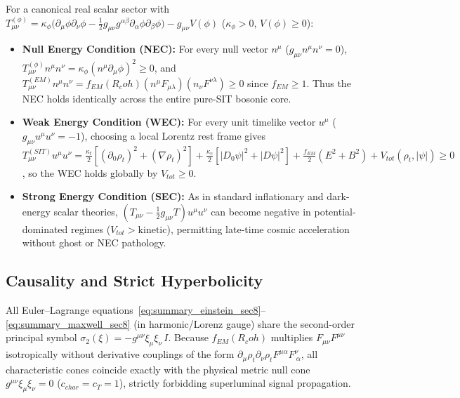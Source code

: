 \documentclass[american,11pt,letterpaper]{article}
\newcommand{\Rcoh}{R_{\mathrm{coh}}}
\def\mathbf#1{#1}%
\def\mathrm#1{#1}%
\def\Rcoh{R_coh}%
\begin{document}
For a canonical real scalar sector with $T_{\mu\nu}^{(\phi)} = \kappa_\phi\bigl(\partial_\mu\phi\partial_\nu\phi - \frac{1}{2}g_{\mu\nu}g^{\alpha\beta}\partial_\alpha\phi\partial_\beta\phi\bigr) - g_{\mu\nu}V(\phi)$ ($\kappa_\phi > 0$, $V(\phi) \ge 0$):
\begin{itemize}
  \item \textbf{Null Energy Condition (NEC):} For every null vector $n^\mu$ ($g_{\mu\nu}n^\mu n^\nu = 0$), $T_{\mu\nu}^{(\phi)}n^\mu n^\nu = \kappa_\phi(n^\mu\partial_\mu\phi)^2 \ge 0$, and $T_{\mu\nu}^{(\mathrm{EM})}n^\mu n^\nu = f_{\mathrm{EM}}(\Rcoh)(n^\mu F_{\mu\lambda})(n_\nu F^{\nu\lambda}) \ge 0$ since $f_{\mathrm{EM}} \ge 1$. Thus the NEC holds identically across the entire pure-SIT bosonic core.
  \item \textbf{Weak Energy Condition (WEC):} For every unit timelike vector $u^\mu$ ($g_{\mu\nu}u^\mu u^\nu = -1$), choosing a local Lorentz rest frame gives $T_{\mu\nu}^{(\mathrm{SIT})}u^\mu u^\nu = \frac{\kappa_t}{2}[(\partial_0\rho_t)^2 + (\nabla\rho_t)^2] + \frac{\kappa_c}{2}[|D_0\psi|^2 + |\mathbf{D}\psi|^2] + \frac{f_{\mathrm{EM}}}{2}(\mathbf{E}^2 + \mathbf{B}^2) + V_{\mathrm{tot}}(\rho_t,|\psi|) \ge 0$, so the WEC holds globally by $V_{\mathrm{tot}} \ge 0$.
  \item \textbf{Strong Energy Condition (SEC):} As in standard inflationary and dark-energy scalar theories, $(T_{\mu\nu} - \frac{1}{2}g_{\mu\nu}T)u^\mu u^\nu$ can become negative in potential-dominated regimes ($V_{\mathrm{tot}} > \text{kinetic}$), permitting late-time cosmic acceleration without ghost or NEC pathology.
\end{itemize}

\subsection{Causality and Strict Hyperbolicity}

All Euler--Lagrange equations~\eqref{eq:summary_einstein_sec8}--\eqref{eq:summary_maxwell_sec8} (in harmonic/Lorenz gauge) share the second-order principal symbol $\sigma_2(\xi) = -g^{\mu\nu}\xi_\mu\xi_\nu\,I$. Because $f_{\mathrm{EM}}(\Rcoh)$ multiplies $F_{\mu\nu}F^{\mu\nu}$ isotropically without derivative couplings of the form $\partial_\mu\rho_t\partial_\nu\rho_t F^{\mu\alpha}F^\nu_{\ \alpha}$, all characteristic cones coincide exactly with the physical metric null cone $g^{\mu\nu}\xi_\mu\xi_\nu = 0$ ($c_{\mathrm{char}} = c_T = 1$), strictly forbidding superluminal signal propagation.
\end{document}
